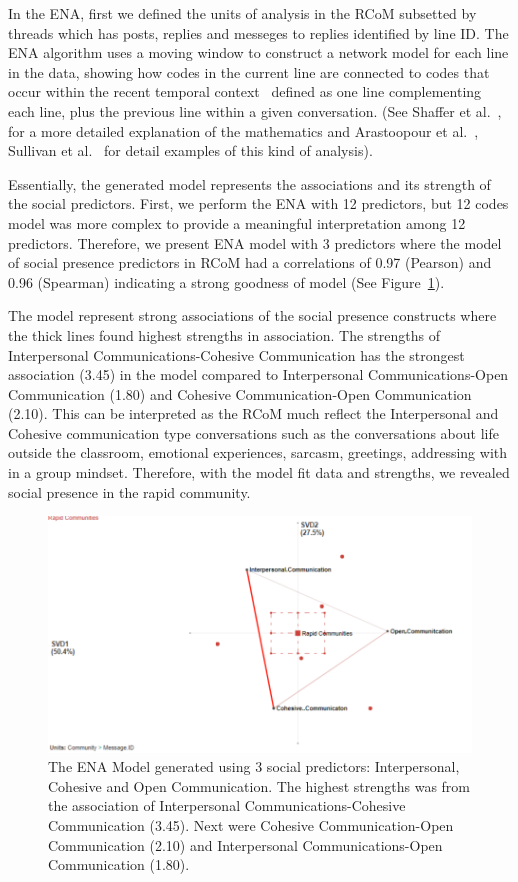 \documentclass[format=acmsmall, review=false, screen=true]{acmart}
\begin{document}
In the ENA, first we defined the units of analysis in the RCoM subsetted by threads which has posts, replies and messeges to replies identified by line ID. The ENA algorithm uses a moving window to construct a network model for each line in the data, showing how codes in the current line are connected to codes that occur within the recent temporal context~\cite{siebert2017search} defined as one line complementing each line, plus the previous line within a given conversation. (See Shaffer et al.~\cite{shaffer2016tutorial}, for a more detailed explanation of the mathematics and Arastoopour et al.~\cite{arastoopour2015epistemic}, Sullivan et al.~\cite{sullivan2018using} for detail examples of this kind of analysis). 

Essentially, the generated model represents the associations and its strength of the social predictors. First, we perform the ENA with 12 predictors, but 12 codes model was more complex to provide a meaningful interpretation among 12 predictors. Therefore, we present ENA model with 3 predictors where the model of social presence predictors in RCoM had a correlations of 0.97 (Pearson) and 0.96 (Spearman) indicating a strong goodness of model (See Figure~\ref{fig:primary}).

The model represent strong associations of the social presence constructs where the thick lines found highest strengths in association. The strengths of Interpersonal Communications-Cohesive Communication has the strongest association (3.45) in the model compared to Interpersonal Communications-Open Communication (1.80) and Cohesive Communication-Open Communication (2.10). This can be interpreted as the RCoM much reflect the Interpersonal and Cohesive communication type conversations such as the conversations about life outside the classroom, emotional experiences, sarcasm, greetings, addressing with in a group mindset. Therefore, with the model fit data and strengths, we revealed social presence in the rapid community. 
\begin{figure}[h]
 \centering
 \includegraphics[width=0.7\linewidth]{images/ENASocialP.png}
 \caption{The ENA Model generated using 3 social predictors: Interpersonal, Cohesive and Open Communication. The highest strengths was from the association of Interpersonal Communications-Cohesive Communication (3.45). Next were Cohesive Communication-Open Communication (2.10) and Interpersonal Communications-Open Communication (1.80). }
 \label{fig:primary}
\end{figure}
\end{document}
